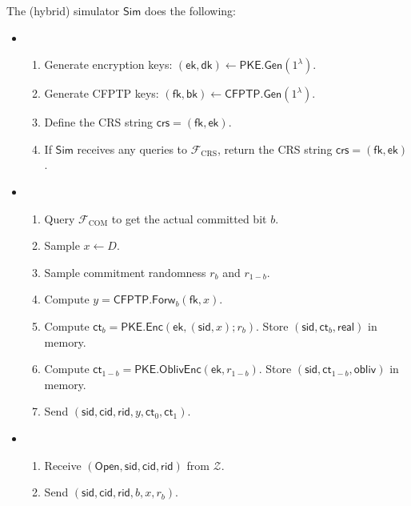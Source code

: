 \documentclass[11pt,letterpaper]{article}
\theoremstyle{plain} %
\theoremstyle{definition} %
\theoremstyle{remark} %
\newcommand{\OpenMsg}{\mathsf{Open}}
\newcommand{\real}{\mathsf{real}}
\newcommand{\obliv}{\mathsf{obliv}}
\newcommand{\Input}{x}
\newcommand{\SecParam}{\lambda}
\newcommand{\PKE}{\mathsf{PKE}}
\newcommand{\Gen}{\mathsf{Gen}}
\newcommand{\Enc}{\mathsf{Enc}}
\newcommand{\OblivEnc}{\mathsf{OblivEnc}}
\newcommand{\EncKey}{\mathsf{ek}}
\newcommand{\DecKey}{\mathsf{dk}}
\newcommand{\Ct}{\mathsf{ct}}
\newcommand{\Rand}{r}
\newcommand{\CFPTP}{\mathsf{CFPTP}}
\newcommand{\Forw}{\mathsf{Forw}}
\newcommand{\ForwKey}{\mathsf{fk}}
\newcommand{\BackKey}{\mathsf{bk}}
\newcommand{\Domain}{D}
\newcommand{\Output}{y}
\newcommand{\Simulator}{{\mathsf{Sim}}} %
\newcommand{\Environment}{{\mathcal{Z}}} %
\newcommand{\IF}{\mathcal{F}} %
\newcommand{\sid}{\mathsf{sid}}
\newcommand{\CommitterId}{\mathsf{cid}}
\newcommand{\ReceiverId}{\mathsf{rid}}
\newcommand{\IFCrs}{\IF_{\mathrm{CRS}}}
\newcommand{\crs}{\mathsf{crs}}
\newcommand{\IFCom}{\IF_{\mathrm{COM}}}
\newcommand{\CommBit}{b}
\begin{document}
The (hybrid) simulator $\Simulator$ does the following:
\begin{itemize}
\item \parhead{Simulate $\IFCrs$}
\begin{enumerate}[nolistsep]
    \item Generate encryption keys: $(\EncKey, \DecKey) \gets \PKE.\Gen(1^{\SecParam})$.
    \item Generate CFPTP keys: $(\ForwKey,\BackKey) \gets \CFPTP.\Gen(1^{\SecParam})$.
    \item Define the CRS string $\crs = (\ForwKey, \EncKey)$.
    \item If $\Simulator$ receives any queries to $\IFCrs$, return the CRS string $\crs = (\ForwKey, \EncKey)$.
\end{enumerate}

\item {}
\begin{enumerate}[nolistsep]
    \item Query $\IFCom$ to get the actual committed bit $\CommBit$.
	\item Sample $\Input \gets \Domain$.
	\item Sample commitment randomness $\Rand_{\CommBit}$ and $\Rand_{1-\CommBit}$.
	\item Compute $\Output = \CFPTP.\Forw_{\CommBit}(\ForwKey,\Input)$.
	\item Compute $\Ct_{\CommBit} = \PKE.\Enc(\EncKey, (\sid,\Input); \Rand_\CommBit)$. Store $(\sid,\Ct_{\CommBit},\real)$ in memory.
	\item Compute $\Ct_{1-\CommBit} = \PKE.\OblivEnc(\EncKey, \Rand_{1-\CommBit})$. Store $(\sid,\Ct_{1-\CommBit},\obliv)$ in memory.
	\item Send $(\sid,\CommitterId,\ReceiverId,\Output, \Ct_0, \Ct_1)$.
\end{enumerate}

\item {}
\begin{enumerate}[nolistsep]
\item Receive $(\OpenMsg,\sid,\CommitterId,\ReceiverId)$ from $\Environment$.
\item Send $(\sid,\CommitterId,\ReceiverId,\CommBit, \Input, \Rand_{\CommBit})$.
\end{enumerate}
\end{itemize}


\end{document}
